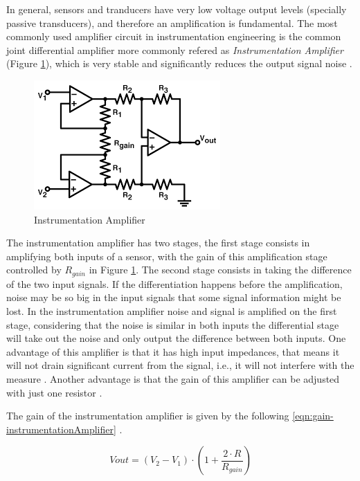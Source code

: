 	In general, sensors and tranducers have very low voltage output levels (specially passive transducers), and therefore an amplification is fundamental. The most commonly used amplifier circuit in instrumentation engineering is the common joint differential amplifier more commonly refered as \textit{Instrumentation Amplifier} (Figure \ref{fig:instrumentation-amplifier}), which is very stable and significantly reduces the output signal noise \cite{wait1975introduction}.

	\begin{figure}[htbp]
		\centering
			\includegraphics[scale=1.25]{figuras/fig-instrumentation-amp.png}
		\caption{Instrumentation Amplifier \cite{3opamp}}
		\label{fig:instrumentation-amplifier}
	\end{figure}

	The instrumentation amplifier has two stages, the first stage consists in amplifying both inputs of a sensor, with the gain of this amplification stage controlled by $R_{gain}$ in Figure \ref{fig:instrumentation-amplifier}. The second stage consists in taking the difference of the two input signals. If the differentiation happens before the amplification, noise may be so big in the input signals that some signal information might be lost. In the instrumentation amplifier noise and signal is amplified on the first stage, considering that the noise is similar in both inputs the differential stage will take out the noise and only output the difference between both inputs. One advantage of this amplifier is that it has high input impedances, that means it will not drain significant current from the signal, i.e., it will not interfere with the measure \cite{thomsen2003application}. Another advantage is that the gain of this amplifier can be adjusted with just one resistor \cite{mettingvanrijn1994amplifiers}.
	\par
	The gain of the instrumentation amplifier is given by the following \ref{eqn:gain-instrumentationAmplifier} \cite{analogDevDesignersGuide}.

	\begin{equation}
		Vout = \left( V_{2} - V_{1} \right) \cdot \left( 1 + \frac{2\cdot R}{R_{gain}} \right)
	\end{equation}\label{eqn:gain-instrumentationAmplifier}

